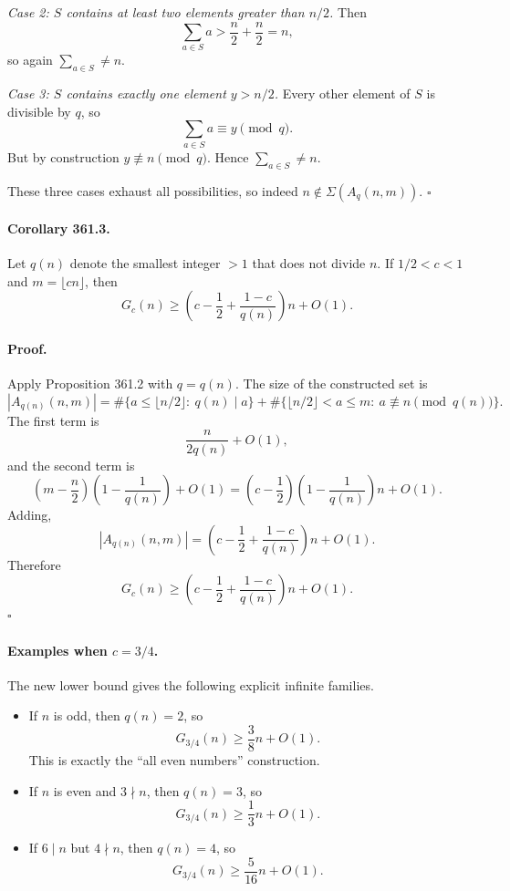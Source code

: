 \smallskip
\noindent
\emph{Case 2: $S$ contains at least two elements greater than $n/2$.}
Then
\[
\sum_{a\in S} a > \frac n2 + \frac n2 = n,
\]
so again $\sum_{a\in S}\neq n$.

\smallskip
\noindent
\emph{Case 3: $S$ contains exactly one element $y>n/2$.}
Every other element of $S$ is divisible by $q$, so
\[
\sum_{a\in S} a \equiv y \pmod q.
\]
But by construction $y\not\equiv n\pmod q$.  Hence $\sum_{a\in S}\neq n$.

These three cases exhaust all possibilities, so indeed $n\notin \Sigma(A_q(n,m))$.
\hfill $\square$

\paragraph{Corollary 361.3.}
Let $q(n)$ denote the smallest integer $>1$ that does not divide $n$.  If $1/2<c<1$ and $m=\lfloor cn\rfloor$, then
\[
G_c(n)\ge \left(c-\frac12+\frac{1-c}{q(n)}\right)n+O(1).
\]

\paragraph{Proof.}
Apply Proposition 361.2 with $q=q(n)$.  The size of the constructed set is
\[
|A_{q(n)}(n,m)|
=
\#\{a\le \lfloor n/2\rfloor:\ q(n)\mid a\}
+
\#\{\lfloor n/2\rfloor<a\le m:\ a\not\equiv n\pmod{q(n)}\}.
\]
The first term is
\[
\frac{n}{2q(n)}+O(1),
\]
and the second term is
\[
\left(m-\frac n2\right)\left(1-\frac1{q(n)}\right)+O(1)
=
\left(c-\frac12\right)\left(1-\frac1{q(n)}\right)n+O(1).
\]
Adding,
\[
|A_{q(n)}(n,m)|
=
\left(c-\frac12+\frac{1-c}{q(n)}\right)n+O(1).
\]
Therefore
\[
G_c(n)\ge \left(c-\frac12+\frac{1-c}{q(n)}\right)n+O(1).
\]
\hfill $\square$

\paragraph{Examples when $c=3/4$.}
The new lower bound gives the following explicit infinite families.

\begin{itemize}
\item If $n$ is odd, then $q(n)=2$, so
\[
G_{3/4}(n)\ge \frac{3}{8}n+O(1).
\]
This is exactly the ``all even numbers'' construction.

\item If $n$ is even and $3\nmid n$, then $q(n)=3$, so
\[
G_{3/4}(n)\ge \frac13 n+O(1).
\]

\item If $6\mid n$ but $4\nmid n$, then $q(n)=4$, so
\[
G_{3/4}(n)\ge \frac{5}{16}n+O(1).
\]
\end{itemize}

